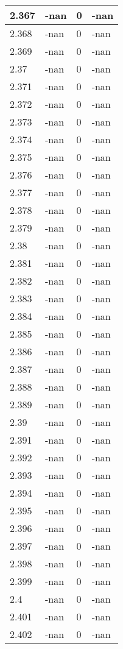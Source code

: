 \documentclass[a4paper,14pt]{extarticle}
\begin{document}
\begin{longtable}{||m{3cm}||m{3cm}|m{3cm}||m{3cm}||}
\hline
2.367 & -nan & 0 & -nan\\
\hline
2.368 & -nan & 0 & -nan\\
\hline
2.369 & -nan & 0 & -nan\\
\hline
2.37 & -nan & 0 & -nan\\
\hline
2.371 & -nan & 0 & -nan\\
\hline
2.372 & -nan & 0 & -nan\\
\hline
2.373 & -nan & 0 & -nan\\
\hline
2.374 & -nan & 0 & -nan\\
\hline
2.375 & -nan & 0 & -nan\\
\hline
2.376 & -nan & 0 & -nan\\
\hline
2.377 & -nan & 0 & -nan\\
\hline
2.378 & -nan & 0 & -nan\\
\hline
2.379 & -nan & 0 & -nan\\
\hline
2.38 & -nan & 0 & -nan\\
\hline
2.381 & -nan & 0 & -nan\\
\hline
2.382 & -nan & 0 & -nan\\
\hline
2.383 & -nan & 0 & -nan\\
\hline
2.384 & -nan & 0 & -nan\\
\hline
2.385 & -nan & 0 & -nan\\
\hline
2.386 & -nan & 0 & -nan\\
\hline
2.387 & -nan & 0 & -nan\\
\hline
2.388 & -nan & 0 & -nan\\
\hline
2.389 & -nan & 0 & -nan\\
\hline
2.39 & -nan & 0 & -nan\\
\hline
2.391 & -nan & 0 & -nan\\
\hline
2.392 & -nan & 0 & -nan\\
\hline
2.393 & -nan & 0 & -nan\\
\hline
2.394 & -nan & 0 & -nan\\
\hline
2.395 & -nan & 0 & -nan\\
\hline
2.396 & -nan & 0 & -nan\\
\hline
2.397 & -nan & 0 & -nan\\
\hline
2.398 & -nan & 0 & -nan\\
\hline
2.399 & -nan & 0 & -nan\\
\hline
2.4 & -nan & 0 & -nan\\
\hline
2.401 & -nan & 0 & -nan\\
\hline
2.402 & -nan & 0 & -nan\\

\end{longtable}
\end{document}
